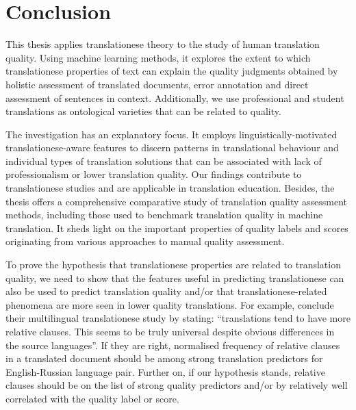\chapter{\label{cha:fin}Conclusion}
This thesis applies translationese theory to the study of human translation quality. 
Using machine learning methods, it explores the extent to which translationese properties of text can explain the quality judgments obtained by holistic assessment of translated documents, error annotation and direct assessment of sentences in context. Additionally, we use professional and student translations as ontological varieties that can be related to quality. 

The investigation has an explanatory focus. It employs linguistically-motivated translationese-aware features to discern patterns in translational behaviour and individual types of translation solutions that can be associated with lack of professionalism or lower translation quality. Our findings contribute to translationese studies and are applicable in translation education. 
Besides, the thesis offers a comprehensive comparative study of translation quality assessment methods, including those used to benchmark translation quality in machine translation. It sheds light on the important properties of quality labels and scores originating from various approaches to manual quality assessment. 

To prove the hypothesis that translationese properties are related to translation quality, we need to show that the features useful in predicting translationese can also be used to predict translation quality and/or that translationese-related phenomena are more seen in lower quality translations. For example, \citet[][p.357]{Hu2021} conclude their multilingual translationese study by stating: ``translations tend to have more relative clauses. This seems to be truly universal despite obvious differences in the source languages''. If they are right, normalised frequency of relative clauses in a translated document should be among strong translation predictors for English-Russian language pair. Further on, if our hypothesis stands, relative clauses should be on the list of strong quality predictors and/or by relatively well correlated with the quality label or score. 

